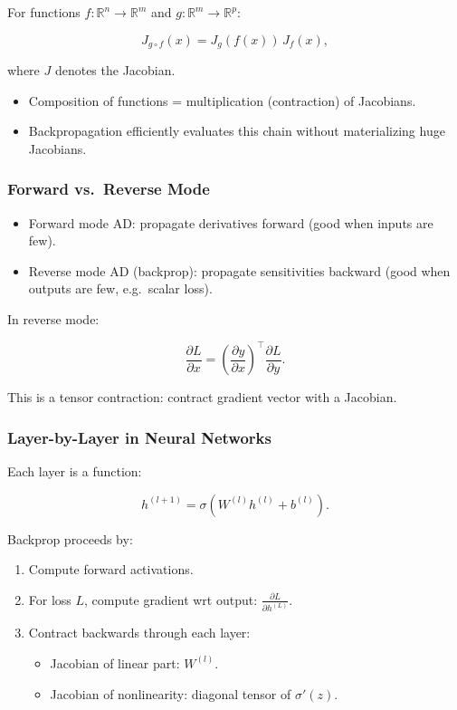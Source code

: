 \documentclass[
  letterpaper,
  DIV=11,
  numbers=noendperiod]{scrreprt}
\providecommand{\tightlist}{%
  \setlength{\itemsep}{0pt}\setlength{\parskip}{0pt}}
\begin{document}
For functions \(f: \mathbb{R}^n \to \mathbb{R}^m\) and
\(g: \mathbb{R}^m \to \mathbb{R}^p\):

\[
J_{g \circ f}(x) = J_g(f(x)) \, J_f(x),
\]

where \(J\) denotes the Jacobian.

\begin{itemize}
\tightlist
\item
  Composition of functions = multiplication (contraction) of Jacobians.
\item
  Backpropagation efficiently evaluates this chain without materializing
  huge Jacobians.
\end{itemize}

\subsubsection{Forward vs.~Reverse Mode}\label{forward-vs.-reverse-mode}

\begin{itemize}
\tightlist
\item
  Forward mode AD: propagate derivatives forward (good when inputs are
  few).
\item
  Reverse mode AD (backprop): propagate sensitivities backward (good
  when outputs are few, e.g.~scalar loss).
\end{itemize}

In reverse mode:

\[
\frac{\partial L}{\partial x} = \left( \frac{\partial y}{\partial x} \right)^\top \frac{\partial L}{\partial y}.
\]

This is a tensor contraction: contract gradient vector with a Jacobian.

\subsubsection{Layer-by-Layer in Neural
Networks}\label{layer-by-layer-in-neural-networks}

Each layer is a function:

\[
h^{(l+1)} = \sigma(W^{(l)} h^{(l)} + b^{(l)}).
\]

Backprop proceeds by:

\begin{enumerate}
\def\labelenumi{\arabic{enumi}.}
\item
  Compute forward activations.
\item
  For loss \(L\), compute gradient wrt output:
  \(\frac{\partial L}{\partial h^{(L)}}\).
\item
  Contract backwards through each layer:

  \begin{itemize}
  \tightlist
  \item
    Jacobian of linear part: \(W^{(l)}\).
  \item
    Jacobian of nonlinearity: diagonal tensor of \(\sigma'(z)\).
  \end{itemize}
\end{enumerate}
\end{document}
